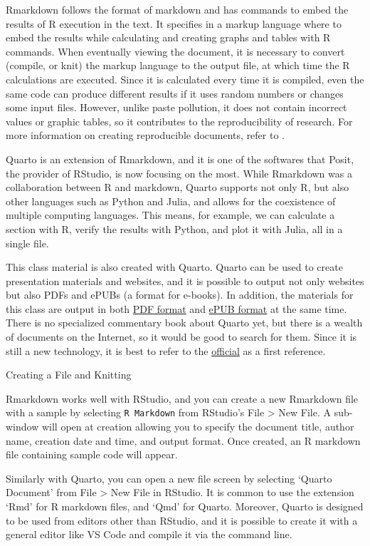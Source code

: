 \documentclass[
  a4paper,
]{book}
\begin{document}
Rmarkdown follows the format of markdown and has commands to embed the
results of R execution in the text. It specifies in a markup language
where to embed the results while calculating and creating graphs and
tables with R commands. When eventually viewing the document, it is
necessary to convert (compile, or knit) the markup language to the
output file, at which time the R calculations are executed. Since it is
calculated every time it is compiled, even the same code can produce
different results if it uses random numbers or changes some input files.
However, unlike paste pollution, it does not contain incorrect values or
graphic tables, so it contributes to the reproducibility of research.
For more information on creating reproducible documents, refer to
\textcite{Takahashi201805}.

Quarto is an extension of Rmarkdown, and it is one of the softwares that
Posit, the provider of RStudio, is now focusing on the most. While
Rmarkdown was a collaboration between R and markdown, Quarto supports
not only R, but also other languages such as Python and Julia, and
allows for the coexistence of multiple computing languages. This means,
for example, we can calculate a section with R, verify the results with
Python, and plot it with Julia, all in a single file.

This class material is also created with Quarto. Quarto can be used to
create presentation materials and websites, and it is possible to output
not only websites but also PDFs and ePUBs (a format for e-books). In
addition, the materials for this class are output in both
\href{Psychology\%20statistics\%20practice.PDF}{PDF format} and
\href{Psychology\%20statistics\%20practice.epub}{ePUB format} at the
same time. There is no specialized commentary book about Quarto yet, but
there is a wealth of documents on the Internet, so it would be good to
search for them. Since it is still a new technology, it is best to refer
to the \href{https://quarto.org/}{official} as a first reference.

Creating a File and Knitting

Rmarkdown works well with RStudio, and you can create a new Rmarkdown
file with a sample by selecting \texttt{R\ Markdown} from RStudio's File
\textgreater{} New File. A sub-window will open at creation allowing you
to specify the document title, author name, creation date and time, and
output format. Once created, an R markdown file containing sample code
will appear.

Similarly with Quarto, you can open a new file screen by selecting
`Quarto Document' from File \textgreater{} New File in RStudio. It is
common to use the extension `Rmd' for R markdown files, and `Qmd' for
Quarto. Moreover, Quarto is designed to be used from editors other than
RStudio, and it is possible to create it with a general editor like VS
Code and compile it via the command line.
\end{document}
